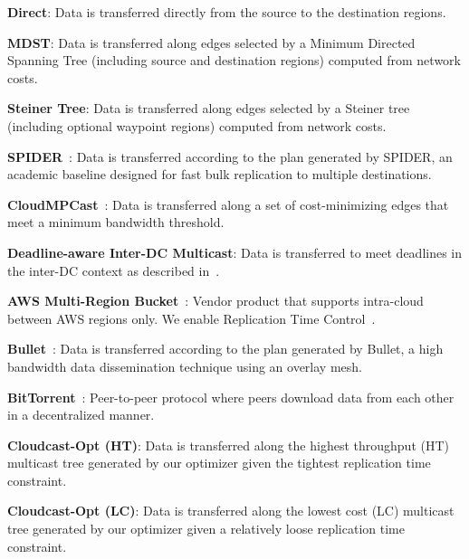 \begin{vitemize}
    \item \textbf{Direct}: Data is transferred directly from the source to the destination regions.  
    \item \textbf{MDST}: Data is transferred along edges selected by a Minimum Directed Spanning Tree (including source and destination regions) computed from network costs. 
    \item \textbf{Steiner Tree}: Data is transferred along edges selected by a Steiner tree (including optional waypoint regions) computed from network costs. 
    \item \textbf{SPIDER}~\cite{ganguly2005fast}: Data is transferred according to the plan generated by SPIDER, an academic baseline designed for fast bulk replication to multiple destinations.
    \item \textbf{CloudMPCast}~\cite{garcia2015cost}: Data is transferred along a set of cost-minimizing edges that meet a minimum bandwidth threshold. 
    \item \textbf{Deadline-aware Inter-DC Multicast}: Data is transferred to meet deadlines in the inter-DC context as described in~\cite{deadline2018}. 
    \item \textbf{AWS Multi-Region Bucket}~\cite{aws-replication}: Vendor product that supports intra-cloud between AWS regions only. We enable Replication Time Control~\cite{aws-replication-time-control}.
    \item \textbf{Bullet}~\cite{kostic2003bullet}: Data is transferred according to the plan generated by Bullet, a high bandwidth data dissemination technique using an overlay mesh.
    \item \textbf{BitTorrent}~\cite{twitter-bittorrent}: Peer-to-peer protocol where peers download data from each other in a decentralized manner.
    \item \textbf{Cloudcast-Opt (HT)}: Data is transferred along the highest throughput (HT) multicast tree generated by our optimizer given the tightest replication time constraint.
    \item \textbf{Cloudcast-Opt (LC)}: Data is transferred along the lowest cost (LC) multicast tree generated by our optimizer given a relatively loose replication time constraint.
\end{vitemize}
\fi

